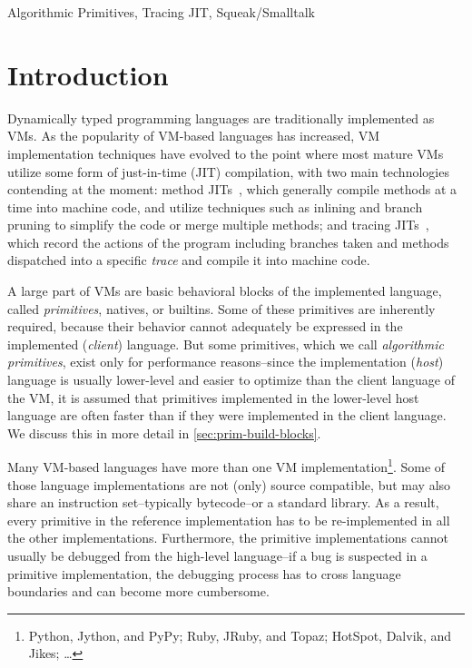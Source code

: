 \documentclass[
10pt,          %
]{sigplanconf}
\begin{document}


\keywords Algorithmic Primitives, Tracing JIT, Squeak/Smalltalk


\def\sectionautorefname{Section}
\def\subsectionautorefname{Section}
\def\subsubsectionautorefname{Section}
\def\tableautorefname{Table}
\def\figureautorefname{Figure}

\section{Introduction}
Dynamically typed programming languages are traditionally implemented as
\acp{VM}. As the popularity of \ac{VM}-based languages has
increased, \ac{VM} implementation techniques have evolved to the point
where most mature \acp{VM} utilize some form of just-in-time (\acs{JIT})
compilation, with two main technologies contending at the moment:
method \acsp{JIT}~\cite{holzle1995adaptive}, which generally compile methods
at a time into machine code, and utilize techniques such as inlining
and branch pruning to simplify the code or merge multiple methods; and
tracing \acsp{JIT}~\cite{bala2000dynamo}, which record the actions of the
program including branches taken and methods dispatched into a
specific \emph{trace} and compile it into machine code.

A large part of \acp{VM} are basic behavioral blocks of the implemented
language, called \emph{primitives}, natives, or builtins. Some of these primitives are
inherently required, because their behavior cannot adequately be expressed in
the implemented (\emph{client}) language. But some primitives, which we call
\emph{algorithmic primitives}, exist only for performance reasons\---since the implementation (\emph{host}) language is usually lower-level and easier to
optimize than the client language of the \ac{VM}, it is assumed that
primitives implemented in the lower-level host language are often faster
than if they were implemented in the client language. We discuss this
in more detail in \autoref{sec:prim-build-blocks}.

Many \ac{VM}-based languages have more than one \ac{VM} 
implementation\footnote{Python, Jython, and PyPy; Ruby, JRuby, and
  Topaz; HotSpot, Dalvik, and Jikes; \ldots}. Some of those
language implementations are not (only) source compatible, but may
also share an instruction set\---typically bytecode\---or a standard library. As a result, every
primitive in the reference implementation has to be re-implemented in
all the other implementations. Furthermore, the primitive
implementations cannot usually be debugged from the high-level
language\---if a bug is suspected in a primitive implementation, the
debugging process has to cross language boundaries and can become
more cumbersome.
\end{document}
